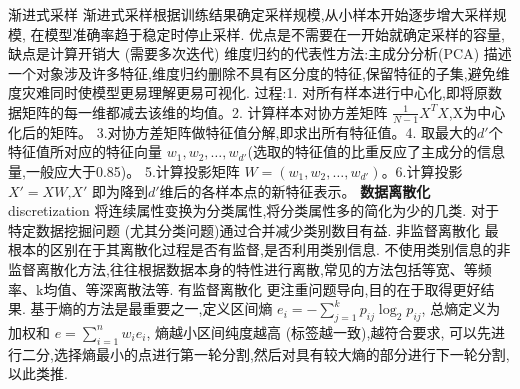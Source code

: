 \documentclass[10pt, utf8]{ctexart}
\begin{document}
\begin{multicols}{4}
    {\color{blue}渐进式采样}
    渐进式采样根据训练结果确定采样规模,从小样本开始逐步增大采样规模,
    在模型准确率趋于稳定时停止采样.
    优点是不需要在一开始就确定采样的容量,缺点是计算开销大 (需要多次迭代)
    {\color{red}维度归约的代表性方法:主成分分析(PCA)}
    描述一个对象涉及许多特征,维度归约删除不具有区分度的特征,保留特征的子集,避免维度灾难同时使模型更易理解更易可视化.
    过程:1. 对所有样本进行中心化,即将原数据矩阵的每一维都减去该维的均值。2. 计算样本对协方差矩阵 $\frac{1}{N-1} X^TX$,X为中心化后的矩阵。
    3.对协方差矩阵做特征值分解,即求出所有特征值。4. 取最大的$d'$个特征值所对应的特征向量 $w_1,w_2,\dots,w_{d'}$(选取的特征值的比重反应了主成分的信息量,一般应大于0.85)。
    5.计算投影矩阵 $W = (w_1,w_2,\dots,w_{d'})$。6.计算投影 $X' = XW$,$X'$ 即为降到$d'$维后的各样本点的新特征表示。
        {\color{purple_}\textbf{数据离散化} discretization}
    将连续属性变换为分类属性,将分类属性多的简化为少的几类.
    对于特定数据挖掘问题 (尤其分类问题)通过合并减少类别数目有益.
    {\color{blue}非监督离散化}
    最根本的区别在于其离散化过程是否有监督,是否利用类别信息.
    不使用类别信息的非监督离散化方法,往往根据数据本身的特性进行离散,常见的方法包括等宽、等频率、k均值、等深离散法等.
    {\color{blue}有监督离散化}
    更注重问题导向,目的在于取得更好结果.
    基于熵的方法是最重要之一,定义区间熵 $e_i=-\sum_{j=1}^{k}p_{ij}\log_{2}p_{ij}$,
    总熵定义为加权和 $e=\sum_{i=1}^{n}w_{i}e_i$,
    熵越小区间纯度越高 (标签越一致),越符合要求,
    可以先进行二分,选择熵最小的点进行第一轮分割,然后对具有较大熵的部分进行下一轮分割,以此类推.


\end{multicols}
\end{document}
